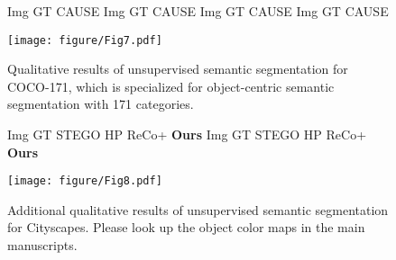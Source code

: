 \documentclass{article} \usepackage{iclr2024_conference,times}
\begin{document}
\begin{figure*}[b]
\centering
\begin{flushleft}
    \hspace{0.3cm} Img \hspace{0.45cm} GT \hspace{0.15cm} CAUSE
    \hspace{0.1cm} Img \hspace{0.45cm} GT \hspace{0.15cm} CAUSE
    \hspace{0.27cm} Img \hspace{0.45cm} GT \hspace{0.15cm} CAUSE
    \hspace{0.1cm} Img \hspace{0.45cm} GT \hspace{0.15cm} CAUSE
\end{flushleft}		
\vspace*{-0.2cm}
\texttt{[image: figure/Fig7.pdf]}
\caption{Qualitative results of unsupervised semantic segmentation for COCO-171, which is specialized for object-centric semantic segmentation with 171 categories.} 
\label{fig:coco171}
\end{figure*}



\begin{figure*}[t]
\centering
\begin{flushleft}
    \hspace{0.3cm} Img \hspace{0.4cm} GT \hspace{0.17cm} STEGO   \hspace{0.18cm} HP
    \hspace{0.23cm} ReCo+
    \hspace{0.07cm} \textbf{Ours}
    \hspace{0.5cm} Img \hspace{0.4cm} GT \hspace{0.17cm} STEGO   \hspace{0.18cm} HP
    \hspace{0.23cm} ReCo+
    \hspace{0.07cm} \textbf{Ours}
\end{flushleft}		
\vspace*{-0.2cm}
\texttt{[image: figure/Fig8.pdf]}
\caption{Additional qualitative results of unsupervised semantic segmentation for Cityscapes. Please look up the object color maps in the main manuscripts.} 
\label{fig:a_city}

\end{figure*}
\end{document}
